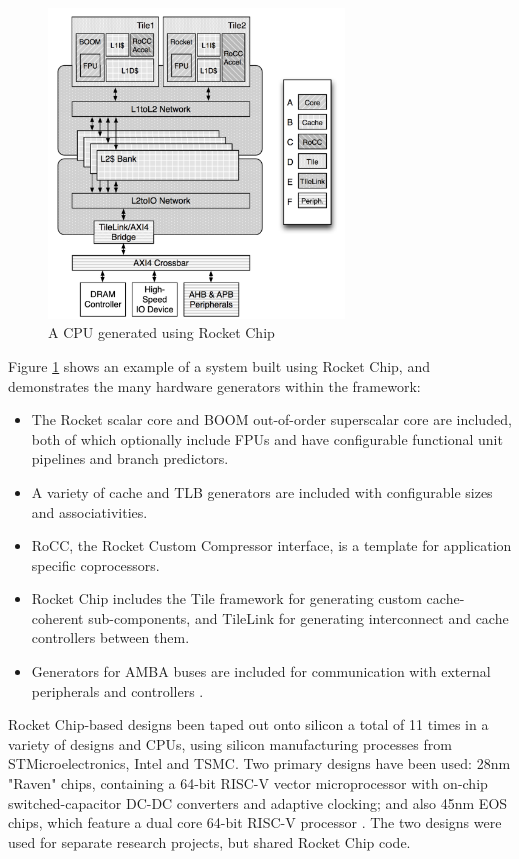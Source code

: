 \documentclass[a4paper,fleqn,12pt]{article}
\begin{document}
\begin{figure}[h!]
	\centering
	\includegraphics[width=0.7\textwidth]{../img/rocket-chip.png}
	\caption{A CPU generated using Rocket Chip \citep{rocketchip}}
	\label{fig:rocket}
\end{figure}


Figure \ref{fig:rocket} shows an example of a system built using Rocket Chip, and demonstrates the many hardware generators within the framework:

\begin{itemize}
	\item The Rocket scalar core and BOOM out-of-order superscalar core are included, both of which optionally include FPUs and have configurable functional unit pipelines and branch predictors.
	\item A variety of cache and TLB generators are included with configurable sizes and associativities.
	\item RoCC, the Rocket Custom Compressor interface, is a template for application specific coprocessors.
	\item Rocket Chip includes the Tile framework for generating custom cache-coherent sub-components, and TileLink for generating interconnect and cache controllers between them.
	\item Generators for AMBA buses are included for communication with external peripherals and controllers \citep{axi}.
\end{itemize}

Rocket Chip-based designs been taped out onto silicon a total of 11 times in a variety of designs and CPUs, using silicon manufacturing processes from STMicroelectronics, Intel and TSMC. Two primary designs have been used: 28nm "Raven" chips, containing a 64-bit RISC-V
vector microprocessor with on-chip switched-capacitor DC-DC converters and adaptive clocking; and also 45nm EOS chips, which feature a dual core 64-bit RISC-V processor \citep{rv2core}. The two designs were used for separate research projects, but shared Rocket Chip code.
\end{document}
